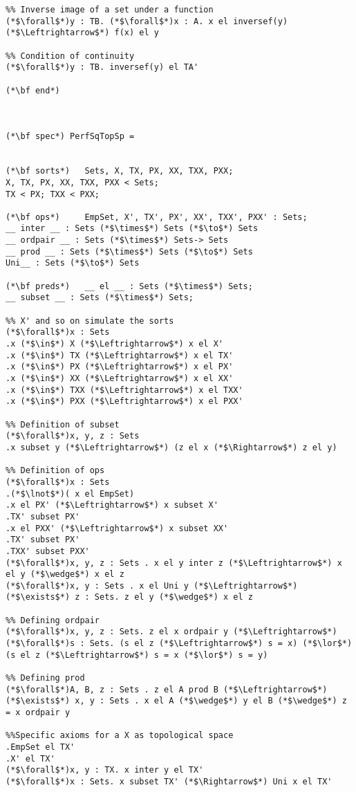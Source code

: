 \begin{lstlisting}
%% Inverse image of a set under a function
(*$\forall$*)y : TB. (*$\forall$*)x : A. x el inversef(y) (*$\Leftrightarrow$*) f(x) el y 

%% Condition of continuity
(*$\forall$*)y : TB. inversef(y) el TA'   

(*\bf end*)



(*\bf spec*) PerfSqTopSp =


(*\bf sorts*)   Sets, X, TX, PX, XX, TXX, PXX;
X, TX, PX, XX, TXX, PXX < Sets;
TX < PX; TXX < PXX;

(*\bf ops*)     EmpSet, X', TX', PX', XX', TXX', PXX' : Sets;
__ inter __ : Sets (*$\times$*) Sets (*$\to$*) Sets
__ ordpair __ : Sets (*$\times$*) Sets-> Sets
__ prod __ : Sets (*$\times$*) Sets (*$\to$*) Sets
Uni__ : Sets (*$\to$*) Sets

(*\bf preds*)   __ el __ : Sets (*$\times$*) Sets;
__ subset __ : Sets (*$\times$*) Sets;

%% X' and so on simulate the sorts
(*$\forall$*)x : Sets
.x (*$\in$*) X (*$\Leftrightarrow$*) x el X'
.x (*$\in$*) TX (*$\Leftrightarrow$*) x el TX'
.x (*$\in$*) PX (*$\Leftrightarrow$*) x el PX'
.x (*$\in$*) XX (*$\Leftrightarrow$*) x el XX'
.x (*$\in$*) TXX (*$\Leftrightarrow$*) x el TXX'
.x (*$\in$*) PXX (*$\Leftrightarrow$*) x el PXX'

%% Definition of subset
(*$\forall$*)x, y, z : Sets
.x subset y (*$\Leftrightarrow$*) (z el x (*$\Rightarrow$*) z el y)

%% Definition of ops
(*$\forall$*)x : Sets
.(*$\lnot$*)( x el EmpSet)
.x el PX' (*$\Leftrightarrow$*) x subset X'  
.TX' subset PX'  
.x el PXX' (*$\Leftrightarrow$*) x subset XX'  
.TX' subset PX'  
.TXX' subset PXX'  
(*$\forall$*)x, y, z : Sets . x el y inter z (*$\Leftrightarrow$*) x el y (*$\wedge$*) x el z 
(*$\forall$*)x, y : Sets . x el Uni y (*$\Leftrightarrow$*) (*$\exists$*) z : Sets. z el y (*$\wedge$*) x el z

%% Defining ordpair
(*$\forall$*)x, y, z : Sets. z el x ordpair y (*$\Leftrightarrow$*) (*$\forall$*)s : Sets. (s el z (*$\Leftrightarrow$*) s = x) (*$\lor$*) (s el z (*$\Leftrightarrow$*) s = x (*$\lor$*) s = y)  

%% Defining prod
(*$\forall$*)A, B, z : Sets . z el A prod B (*$\Leftrightarrow$*) (*$\exists$*) x, y : Sets . x el A (*$\wedge$*) y el B (*$\wedge$*) z = x ordpair y 	

%%Specific axioms for a X as topological space
.EmpSet el TX'
.X' el TX'
(*$\forall$*)x, y : TX. x inter y el TX'
(*$\forall$*)x : Sets. x subset TX' (*$\Rightarrow$*) Uni x el TX'



\end{lstlisting}
